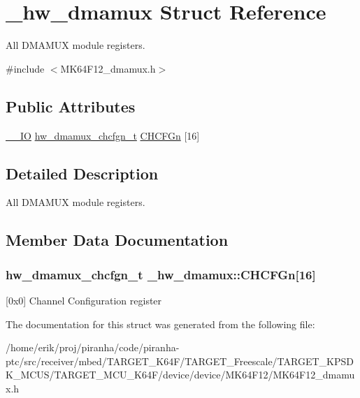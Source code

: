 \hypertarget{struct__hw__dmamux}{}\section{\+\_\+hw\+\_\+dmamux Struct Reference}
\label{struct__hw__dmamux}


All D\+M\+A\+M\+UX module registers.  




{\ttfamily \#include $<$M\+K64\+F12\+\_\+dmamux.\+h$>$}

\subsection*{Public Attributes}
\begin{DoxyCompactItemize}
\item 
\hyperlink{core__sc300_8h_aec43007d9998a0a0e01faede4133d6be}{\+\_\+\+\_\+\+IO} \hyperlink{union__hw__dmamux__chcfgn}{hw\+\_\+dmamux\+\_\+chcfgn\+\_\+t} \hyperlink{struct__hw__dmamux_adf5b35bdc6ef9aaeaba8413ae87f7de4}{C\+H\+C\+F\+Gn} \mbox{[}16\mbox{]}
\end{DoxyCompactItemize}


\subsection{Detailed Description}
All D\+M\+A\+M\+UX module registers. 

\subsection{Member Data Documentation}
\subsubsection[{\texorpdfstring{C\+H\+C\+F\+Gn}{CHCFGn}}]{ {\bf hw\+\_\+dmamux\+\_\+chcfgn\+\_\+t} \+\_\+hw\+\_\+dmamux\+::\+C\+H\+C\+F\+Gn\mbox{[}16\mbox{]}}\hypertarget{struct__hw__dmamux_adf5b35bdc6ef9aaeaba8413ae87f7de4}{}\label{struct__hw__dmamux_adf5b35bdc6ef9aaeaba8413ae87f7de4}
\mbox{[}0x0\mbox{]} Channel Configuration register 

The documentation for this struct was generated from the following file\+:\begin{DoxyCompactItemize}
\item 
/home/erik/proj/piranha/code/piranha-\/ptc/src/receiver/mbed/\+T\+A\+R\+G\+E\+T\+\_\+\+K64\+F/\+T\+A\+R\+G\+E\+T\+\_\+\+Freescale/\+T\+A\+R\+G\+E\+T\+\_\+\+K\+P\+S\+D\+K\+\_\+\+M\+C\+U\+S/\+T\+A\+R\+G\+E\+T\+\_\+\+M\+C\+U\+\_\+\+K64\+F/device/device/\+M\+K64\+F12/M\+K64\+F12\+\_\+dmamux.\+h\end{DoxyCompactItemize}
